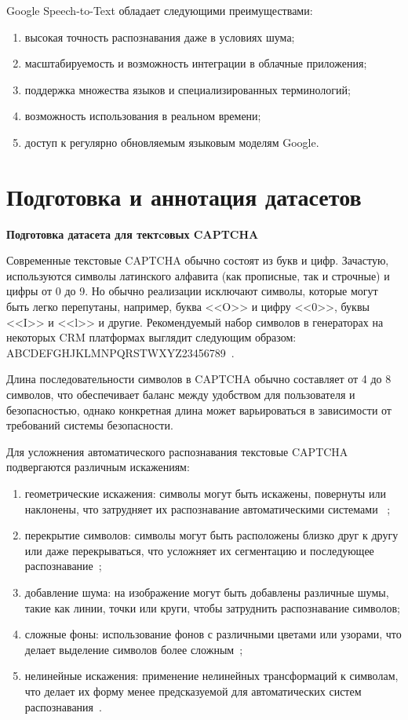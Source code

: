 Google Speech-to-Text обладает следующими преимуществами:

\begin{enumerate}
    \item высокая точность распознавания даже в условиях шума;
    \item масштабируемость и возможность интеграции в облачные приложения;
    \item поддержка множества языков и специализированных терминологий;
    \item возможность использования в реальном времени;
    \item доступ к регулярно обновляемым языковым моделям Google.
\end{enumerate}

\section{Подготовка и аннотация датасетов}

\textbf{Подготовка датасета для тектcовых CAPTCHA}

Современные текстовые CAPTCHA обычно состоят из букв и цифр. Зачастую, 
используются символы латинского алфавита (как прописные, так и строчные) и цифры 
от 0 до 9. Но обычно реализации исключают символы, которые могут быть легко 
перепутаны, например, буква <<O>> и цифру <<0>>, буквы <<I>> и <<l>> и другие. 
Рекомендуемый набор символов в генераторах на некоторых CRM платформах выглядит 
следующим образом: ABCDEFGHJKLMNPQRSTWXYZ23456789~\cite{Bitrix}.

Длина последовательности символов в CAPTCHA обычно составляет от 4 до 8 символов, 
что обеспечивает баланс между удобством для пользователя и безопасностью, однако 
конкретная длина может варьироваться в зависимости от требований системы 
безопасности.

Для усложнения автоматического распознавания текстовые CAPTCHA подвергаются 
различным искажениям:

\begin{enumerate}
    \item геометрические искажения: символы могут быть искажены, повернуты или 
    наклонены, что затрудняет их распознавание автоматическими системами~
    \cite{BrightData};
    \item перекрытие символов: символы могут быть расположены близко друг к 
    другу или даже перекрываться, что усложняет их сегментацию и последующее 
    распознавание~\cite{Proglib};
    \item добавление шума: на изображение могут быть добавлены различные шумы, 
    такие как линии, точки или круги, чтобы затруднить распознавание символов;
    \item сложные фоны: использование фонов с различными цветами или узорами, 
    что делает выделение символов более сложным~\cite{NVJournal};
    \item нелинейные искажения: применение нелинейных трансформаций к символам, 
    что делает их форму менее предсказуемой для автоматических систем 
    распознавания~\cite{Simai}.
\end{enumerate}

